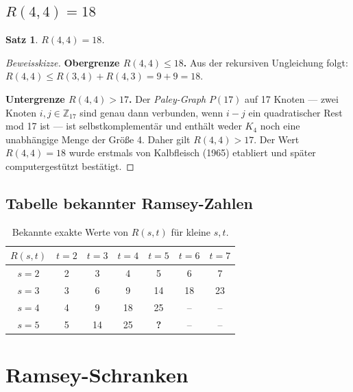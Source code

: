 \documentclass[12pt,a4paper]{amsart}
\newtheorem{theorem}{Satz}[section]
\theoremstyle{definition}
\theoremstyle{remark}
\begin{document}
\subsection{\texorpdfstring{$R(4,4) = 18$}{R(4,4) = 18}}

\begin{theorem}\label{satz:r44}
$R(4,4) = 18$.
\end{theorem}

\begin{proof}[Beweisskizze]
\textbf{Obergrenze $R(4,4) \le 18$.}
Aus der rekursiven Ungleichung folgt:
$R(4,4) \le R(3,4) + R(4,3) = 9 + 9 = 18$.

\textbf{Untergrenze $R(4,4) > 17$.}
Der \emph{Paley-Graph} $P(17)$ auf 17 Knoten — zwei Knoten $i,j \in \mathbb{Z}_{17}$
sind genau dann verbunden, wenn $i-j$ ein quadratischer Rest mod 17 ist — ist
selbstkomplementär und enth\"alt weder $K_4$ noch eine unabh\"angige Menge der
Gr\"o\ss{}e 4.  Daher gilt $R(4,4) > 17$.  Der Wert $R(4,4) = 18$ wurde erstmals
von Kalbfleisch (1965) etabliert und sp\"ater computergest\"utzt best\"atigt.
\end{proof}

\subsection{Tabelle bekannter Ramsey-Zahlen}

\begin{table}[h]
\centering
\caption{Bekannte exakte Werte von $R(s,t)$ f\"ur kleine $s,t$.}
\begin{tabular}{@{}ccccccc@{}}
\toprule
$R(s,t)$ & $t=2$ & $t=3$ & $t=4$ & $t=5$ & $t=6$ & $t=7$ \\
\midrule
$s=2$ & 2 & 3 & 4 & 5 & 6 & 7 \\
$s=3$ & 3 & 6 & 9 & 14 & 18 & 23 \\
$s=4$ & 4 & 9 & 18 & 25 & -- & -- \\
$s=5$ & 5 & 14 & 25 & \textbf{?} & -- & -- \\
\bottomrule
\end{tabular}
\label{tab:ramsey}
\end{table}

\section{Ramsey-Schranken}
\end{document}
